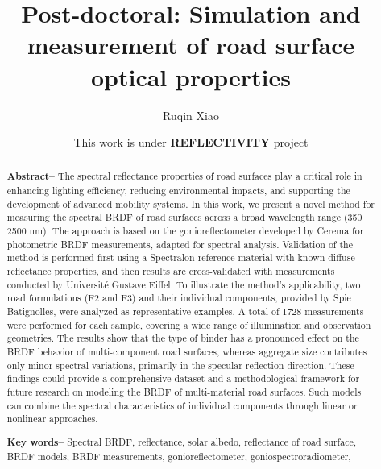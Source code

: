 \documentclass[12pt]{report}
\title{Post-doctoral: Simulation and measurement of road surface optical properties}
\author{Ruqin Xiao}
\date{This work is under \textbf{REFLECTIVITY} project}
\begin{document}
\maketitle
\begin{abstract}

    \textbf{Abstract--}
The spectral reflectance properties of road surfaces play a critical role in enhancing lighting efficiency, reducing environmental impacts, and supporting the development of advanced mobility systems. 
In this work, we present a novel method for measuring the spectral BRDF of road surfaces across a broad wavelength range (350–2500 nm). 
The approach is based on the gonioreflectometer developed by Cerema for photometric BRDF measurements, adapted for spectral analysis. 
Validation of the method is performed first using a Spectralon reference material with known diffuse reflectance properties, and then results are cross-validated with measurements conducted by Université Gustave Eiffel.
To illustrate the method's applicability, two road formulations (F2 and F3) and their individual components, provided by Spie Batignolles, were analyzed as representative examples. 
A total of 1728 measurements were performed for each sample, covering a wide range of illumination and observation geometries. 
The results show that the type of binder has a pronounced effect on the BRDF behavior of multi-component road surfaces, whereas aggregate size contributes only minor spectral variations, primarily in the specular reflection direction.
These findings could provide a comprehensive dataset and a methodological framework for future research on modeling the BRDF of multi-material road surfaces. 
Such models can combine the spectral characteristics of individual components through linear or nonlinear approaches. 



    \textbf{Key words--}
    Spectral BRDF, reflectance, solar albedo, reflectance of road surface, 
    BRDF models,
    BRDF measurements, 
    gonioreflectometer, goniospectroradiometer,
\end{abstract}

\tableofcontents











% 



 

\end{document}
